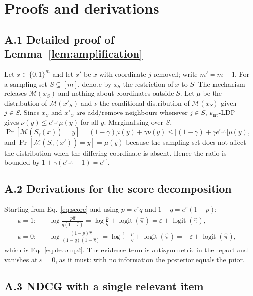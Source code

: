 \documentclass[pdflatex,sn-basic,Numbered]{sn-jnl}
\theoremstyle{plain}
\theoremstyle{remark}
\theoremstyle{definition}
\newcommand{\eps}{\varepsilon}
\newcommand{\Prob}{\Pr}
\newcommand{\logit}{\operatorname{logit}}
\begin{document}
\appendix

\section{Proofs and derivations}\label{app:proofs}

\subsection*{A.1 Detailed proof of Lemma~\ref{lem:amplification}}

Let $x\in\{0,1\}^{m}$ and let $x'$ be $x$ with coordinate $j$ removed; write $m'=m-1$. For a sampling set $S\subseteq[m]$, denote by $x_S$ the restriction of $x$ to $S$. The mechanism releases $\mathcal{M}(x_S)$ and nothing about coordinates outside $S$. Let $\mu$ be the distribution of $\mathcal{M}(x'_{S})$ and $\nu$ the conditional distribution of $\mathcal{M}(x_S)$ given $j\in S$. Since $x_S$ and $x'_S$ are add/remove neighbours whenever $j\in S$, $\eps_{\text{int}}$-LDP gives $\nu(y)\le e^{\eps_{\text{int}}}\mu(y)$ for all $y$. Marginalising over $S$,
\begin{equation}
\Prob[\mathcal{M}(S_\gamma(x))=y]=(1-\gamma)\mu(y)+\gamma\nu(y)
\le\big[(1-\gamma)+\gamma e^{\eps_{\text{int}}}\big]\mu(y),
\end{equation}
and $\Prob[\mathcal{M}(S_\gamma(x'))=y]=\mu(y)$ because the sampling set does not affect the distribution when the differing coordinate is absent. Hence the ratio is bounded by $1+\gamma(e^{\eps_{\text{int}}}-1)=e^{\eps'}$.

\subsection*{A.2 Derivations for the score decomposition}

Starting from Eq.~\eqref{eq:score} and using $p=e^{\eps}q$ and $1-q=e^{\eps}(1-p)$:
\begin{align}
a=1:&\quad \log\frac{p\hat\pi}{q(1-\hat\pi)}=\log\frac{p}{q}+\logit(\hat\pi)=\eps+\logit(\hat\pi),\\
a=0:&\quad \log\frac{(1-p)\hat\pi}{(1-q)(1-\hat\pi)}=\log\frac{1-p}{1-q}+\logit(\hat\pi)=-\eps+\logit(\hat\pi),
\end{align}
which is Eq.~\eqref{eq:decomp2}. The evidence term is antisymmetric in the report and vanishes at $\eps=0$, as it must: with no information the posterior equals the prior.

\subsection*{A.3 NDCG with a single relevant item}
\end{document}
